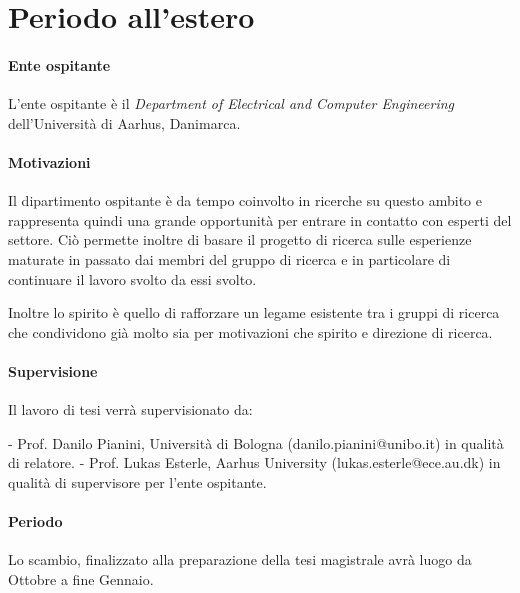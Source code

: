 \documentclass[12pt, a4paper]{article}
\begin{document}
\section{Periodo all'estero}

\paragraph{Ente ospitante}
L'ente ospitante è il \textit{Department of Electrical and Computer Engineering} dell'Università di Aarhus, Danimarca.

\paragraph{Motivazioni}
Il dipartimento ospitante è da tempo coinvolto in ricerche su questo ambito e rappresenta
quindi una grande opportunità per entrare in contatto con esperti del settore.
Ciò permette inoltre di basare il progetto di ricerca sulle esperienze maturate in passato
dai membri del gruppo di ricerca e in particolare di continuare il lavoro svolto da essi svolto.

Inoltre lo spirito è quello di rafforzare un legame esistente tra i gruppi di ricerca che
condividono già molto sia per motivazioni che spirito e direzione di ricerca.

\paragraph{Supervisione}
Il lavoro di tesi verrà supervisionato da:

- Prof. Danilo Pianini, Università di Bologna (danilo.pianini@unibo.it) in qualità di relatore.
- Prof. Lukas Esterle, Aarhus University (lukas.esterle@ece.au.dk) in qualità di supervisore per l'ente ospitante.

\paragraph{Periodo}
Lo scambio, finalizzato alla preparazione della tesi magistrale avrà luogo da Ottobre a fine Gennaio.
\end{document}
